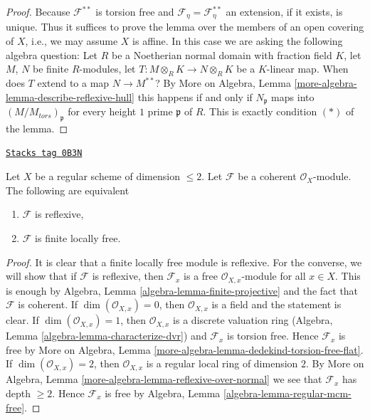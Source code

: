 \begin{proof}
Because $\mathcal{F}^{**}$ is torsion free and
$\mathcal{F}_\eta = \mathcal{F}^{**}_\eta$ an extension, if it exists,
is unique. Thus it suffices to prove the lemma over the members of an
open covering of $X$, i.e., we may assume $X$ is affine. In this case
we are asking the following algebra question: Let $R$ be a Noetherian
normal domain with fraction field $K$, let $M$, $N$ be finite $R$-modules,
let $T : M \otimes_R K \to N \otimes_R K$ be a $K$-linear map. When
does $T$ extend to a map $N \to M^{**}$? By More on Algebra, Lemma
\ref{more-algebra-lemma-describe-reflexive-hull}
this happens if and only if $N_\mathfrak p$ maps into
$(M/M_{tors})_\mathfrak p$ for every height $1$ prime $\mathfrak p$ of $R$.
This is exactly condition $(*)$ of the lemma.
\end{proof}

\begin{lemma}
\label{divisors-lemma-reflexive-over-regular-dim-2}
\href{https://stacks.math.columbia.edu/tag/0B3N}{\texttt{Stacks tag 0B3N}}

Let $X$ be a regular scheme of dimension $\leq 2$.
Let $\mathcal{F}$ be a coherent $\mathcal{O}_X$-module.
The following are equivalent
\begin{enumerate}
\item $\mathcal{F}$ is reflexive,
\item $\mathcal{F}$ is finite locally free.
\end{enumerate}
\end{lemma}

\begin{proof}
It is clear that a finite locally free module is reflexive.
For the converse, we will show that if $\mathcal{F}$ is
reflexive, then $\mathcal{F}_x$ is a free $\mathcal{O}_{X, x}$-module
for all $x \in X$. This is enough by
Algebra, Lemma \ref{algebra-lemma-finite-projective}
and the fact that $\mathcal{F}$ is coherent.
If $\dim(\mathcal{O}_{X, x}) = 0$, then
$\mathcal{O}_{X, x}$ is a field and the statement is clear.
If $\dim(\mathcal{O}_{X, x}) = 1$, then $\mathcal{O}_{X, x}$
is a discrete valuation ring
(Algebra, Lemma \ref{algebra-lemma-characterize-dvr})
and $\mathcal{F}_x$ is torsion free.
Hence $\mathcal{F}_x$ is free by More on Algebra, Lemma
\ref{more-algebra-lemma-dedekind-torsion-free-flat}.
If $\dim(\mathcal{O}_{X, x}) = 2$, then $\mathcal{O}_{X, x}$
is a regular local ring of dimension $2$. By
More on Algebra, Lemma \ref{more-algebra-lemma-reflexive-over-normal}
we see that $\mathcal{F}_x$ has depth $\geq 2$.
Hence $\mathcal{F}_x$ is free by
Algebra, Lemma \ref{algebra-lemma-regular-mcm-free}.
\end{proof}


